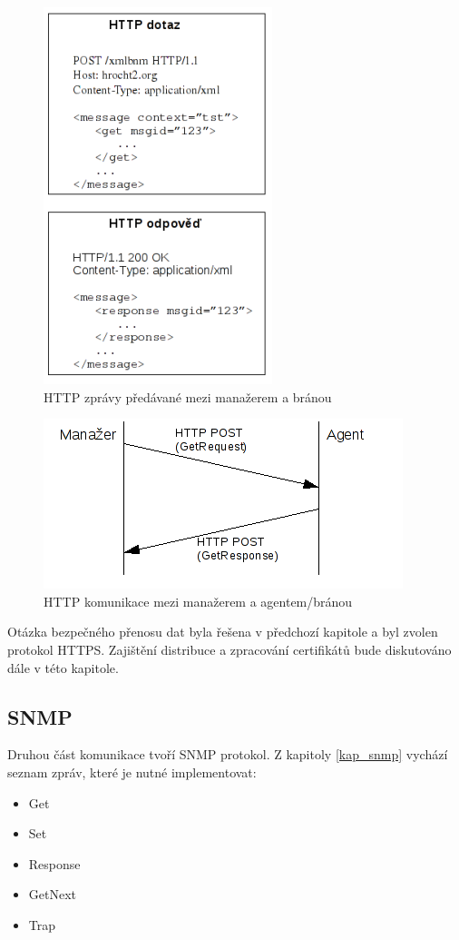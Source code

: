 \begin{figure}[htp]
	\begin{center}
		\includegraphics{obrazky/04_http_post.png}
		\caption{HTTP zprávy předávané mezi manažerem a bránou}
		\label{obr_an_http_post}
	\end{center}
\end{figure}

\begin{figure}[htp]
	\begin{center}
		\includegraphics{obrazky/04_http_request.png}
		\caption{HTTP komunikace mezi manažerem a agentem/bránou}
		\label{obr_an_http_request}
	\end{center}
\end{figure}

Otázka bezpečného přenosu dat byla řešena v předchozí kapitole a byl zvolen protokol HTTPS. Zajištění distribuce a zpracování certifikátů bude
diskutováno dále v této kapitole.


\subsection{SNMP}
Druhou část komunikace tvoří SNMP protokol. Z kapitoly \ref{kap_snmp} vychází seznam zpráv, které je nutné implementovat:
\begin{itemize}
	\item Get
	\item Set
	\item Response
	\item GetNext
	\item Trap
\end{itemize}

